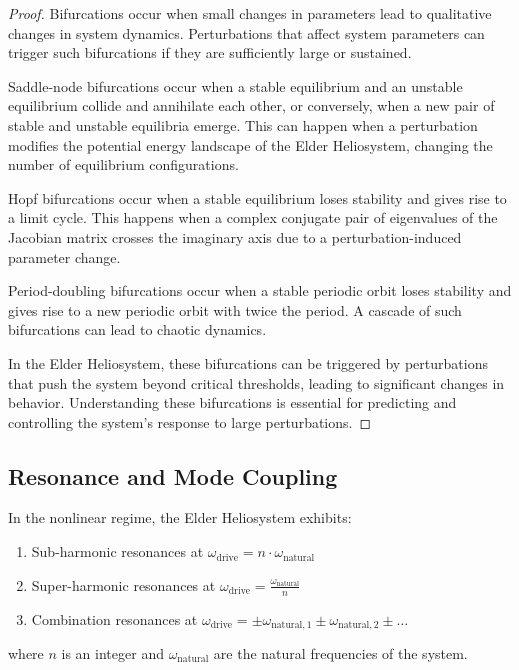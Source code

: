 \begin{proof}
Bifurcations occur when small changes in parameters lead to qualitative changes in system dynamics. Perturbations that affect system parameters can trigger such bifurcations if they are sufficiently large or sustained.

Saddle-node bifurcations occur when a stable equilibrium and an unstable equilibrium collide and annihilate each other, or conversely, when a new pair of stable and unstable equilibria emerge. This can happen when a perturbation modifies the potential energy landscape of the Elder Heliosystem, changing the number of equilibrium configurations.

Hopf bifurcations occur when a stable equilibrium loses stability and gives rise to a limit cycle. This happens when a complex conjugate pair of eigenvalues of the Jacobian matrix crosses the imaginary axis due to a perturbation-induced parameter change.

Period-doubling bifurcations occur when a stable periodic orbit loses stability and gives rise to a new periodic orbit with twice the period. A cascade of such bifurcations can lead to chaotic dynamics.

In the Elder Heliosystem, these bifurcations can be triggered by perturbations that push the system beyond critical thresholds, leading to significant changes in behavior. Understanding these bifurcations is essential for predicting and controlling the system's response to large perturbations.
\end{proof}

\subsection{Resonance and Mode Coupling}

\begin{theorem}
In the nonlinear regime, the Elder Heliosystem exhibits:
\begin{enumerate}
    \item Sub-harmonic resonances at $\omega_{\text{drive}} = n \cdot \omega_{\text{natural}}$
    \item Super-harmonic resonances at $\omega_{\text{drive}} = \frac{\omega_{\text{natural}}}{n}$
    \item Combination resonances at $\omega_{\text{drive}} = \pm \omega_{\text{natural},1} \pm \omega_{\text{natural},2} \pm \ldots$
\end{enumerate}
where $n$ is an integer and $\omega_{\text{natural}}$ are the natural frequencies of the system.
\end{theorem}

